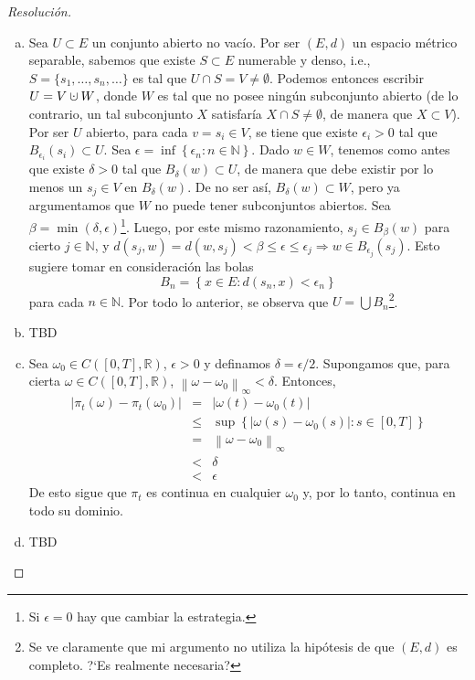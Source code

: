 \documentclass[a4paper,11pt]{article}
\newcommand{\norm}[1]{\left\lVert#1\right\rVert}
\newcommand{\normi}[1]{\norm{#1}_{\infty}}
\newcommand{\CT}{\ensuremath{C([0,T], \mathbb{R})}}
\newcommand{\cupdot}{\mathbin{\mathaccent\cdot\cup}}
\newcommand{\Bola}[2]{\ensuremath{B_{#2}(#1)}}
\begin{document}
\begin{proof}[Resoluci\'on]
$ $

\begin{enumerate}[a)]
    \item Sea $U \subset E$ un conjunto abierto no vacío. Por ser $(E,d)$ un
    espacio métrico separable, sabemos que existe
    $S \subset E$ numerable y denso, i.e., $S = \{s_1,\dots,s_n,\dots\}$
    es tal que $U \cap S = V \neq \emptyset$. Podemos entonces escribir
    $U = V \cupdot W$, donde $W$ es tal que no posee ningún subconjunto
    abierto (de lo contrario, un tal subconjunto $X$ satisfaría 
    $X \cap S \neq \emptyset$, de manera que $X \subset V$).
    Por ser $U$ abierto, para cada $v = s_i \in V$,
    se tiene que existe $\epsilon_i > 0$ tal que
    $\Bola{s_i}{\epsilon_i} \subset U$. Sea
    $\epsilon = \inf \left\{ \epsilon_n : n \in \mathbb{N} \right\}$.
    Dado $w \in W$, tenemos como antes que existe $\delta > 0$ tal que
    $\Bola{w}{\delta} \subset U$, de manera que debe existir por lo menos
    un $s_j \in V$ en $\Bola{w}{\delta}$. De no ser así,
    $\Bola{w}{\delta} \subset W$, pero ya argumentamos que $W$ no puede
    tener subconjuntos abiertos. Sea $\beta = \min(\delta, \epsilon)$\footnote
    {Si $\epsilon = 0$ hay que cambiar la estrategia.}.
    Luego, por este mismo razonamiento, $s_j \in \Bola{w}{\beta}$ para
    cierto $j \in \mathbb{N}$, y
    $d(s_j,w) = d(w,s_j) < \beta \leq \epsilon \leq \epsilon_j \Rightarrow 
    w \in \Bola{s_j}{\epsilon_j}$. Esto sugiere tomar en consideración las
    bolas
    $$B_n = \left\{ x \in E : d(s_n, x) < \epsilon_n \right\}$$
    para cada $n \in \mathbb{N}$. Por todo lo anterior, se observa que
    $U = \bigcup B_n$\footnote{Se ve claramente que mi argumento no utiliza
    la hipótesis de que $(E,d)$ es completo. ?`Es realmente necesaria?}.

    \item TBD

    \item Sea $\omega_0 \in \CT$, $\epsilon >0$ y definamos $\delta = \epsilon/2$.
    Supongamos que, para cierta $\omega \in \CT$,
    $\normi{\omega - \omega_0} < \delta$. Entonces,
    \begin{eqnarray*}
        |\pi_t(\omega) - \pi_t(\omega_0)| &=& |\omega(t) - \omega_0(t)| \\
        &\leq& \sup \left\{ |\omega(s) - \omega_0(s)| : s \in [0,T] \right\} \\
        &=& \normi{\omega - \omega_0} \\
        &<& \delta \\
        &<& \epsilon
    \end{eqnarray*}
    De esto sigue que $\pi_t$ es continua en cualquier $\omega_0$ y, por lo tanto,
    continua en todo su dominio.

    \item TBD
\end{enumerate}

\end{proof}
\end{document}
